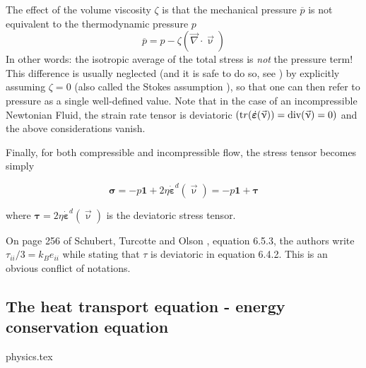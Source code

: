 The effect of the volume viscosity $\zeta$ is that the mechanical pressure $\overline{p}$
is not equivalent to the thermodynamic pressure $p$ 
\begin{equation}
\overline{p}=p - \zeta (\vec\nabla\cdot\vec\upnu)
\end{equation}
In other words: the isotropic average of the total stress is {\sl not} the pressure term!
This difference is usually neglected (and it is safe to do so, see \cite[section 7.02.3.2.2]{berc09}) 
by explicitly assuming $\zeta=0$ (also called the Stokes assumption \cite[p256]{scto01}), 
so that one can then refer to pressure as a single well-defined value.
Note that in the case of an incompressible Newtonian Fluid, 
the strain rate tensor is deviatoric $({\text tr}(\dot{\bm \varepsilon}(\vec\upnu)) 
= \text{div}(\vec\upnu) =0)$ and the above considerations vanish.

Finally, for both compressible and incompressible flow, the stress tensor becomes simply
\begin{mdframed}[backgroundcolor=blue!5]
\begin{equation}
{\bm \sigma}=-p {\bm 1} + 2\eta \dot{\bm \varepsilon}^d(\vec\upnu) = -p {\bm 1} + {\bm \tau}
\end{equation}
\end{mdframed}
where ${\bm \tau} = 2\eta \dot{\bm \varepsilon}^d(\vec\upnu)$ is the deviatoric stress tensor.

\begin{remark}
On page 256 of Schubert, Turcotte and Olson \cite{scto01}, 
equation 6.5.3, the authors write $\tau_{ii}/3=k_B e_{ii}$ while stating that $\tau$ is deviatoric in equation 6.4.2. 
This is an obvious conflict of notations. 
\end{remark}

\subsection{The heat transport equation - energy conservation equation \label{ss:hte}}
\begin{flushright} {\tiny {\color{gray} physics.tex}} \end{flushright}

